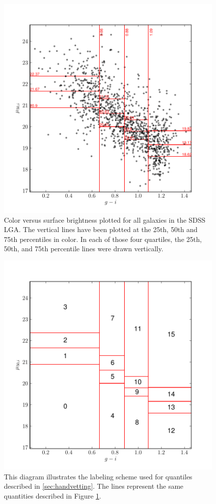 \documentclass[12pt,preprint,pdftex]{aastex}
\begin{document}
\begin{figure}
\centering
\includegraphics[trim=0mm 0mm 0mm 10mm]{quartiles.pdf}
\caption{Color versus surface brightness plotted for all galaxies in the SDSS LGA. The vertical lines have been plotted at the 25th, 50th and 75th percentiles in color. In each of those four quartiles, the 25th, 50th, and 75th percentile lines were drawn vertically.}
\label{fig:quartiles}
\end{figure}

\begin{figure}
\centering
\includegraphics[trim =0mm 0mm 0mm 10mm]{quartile_diagram.pdf}
\caption{This diagram illustrates the labeling scheme used for quantiles described in \ref{sec:handvetting}. The lines represent the same quantities described in Figure \ref{fig:quartiles}.}
\label{fig:quartilediagram}
\end{figure}
\end{document}
